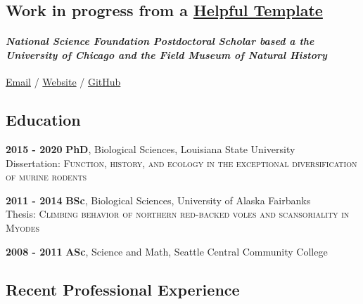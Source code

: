 \documentclass[
]{article}
\author{}
\date{\vspace{-2.5em}}
\begin{document}
\hypertarget{work-in-progress-from-a-helpful-template}{%
\subsection{\texorpdfstring{\textbf{Work in progress from a
\href{https://workwithcarolyn.com/blog/digital-cv-guide}{Helpful
Template}}}{Work in progress from a Helpful Template}}\label{work-in-progress-from-a-helpful-template}}

\hypertarget{national-science-foundation-postdoctoral-scholar-based-a-the-university-of-chicago-and-the-field-museum-of-natural-history}{%
\paragraph{\texorpdfstring{\emph{National Science Foundation
Postdoctoral Scholar based a the University of Chicago and the Field
Museum of Natural History}
}{National Science Foundation Postdoctoral Scholar based a the University of Chicago and the Field Museum of Natural History  }}\label{national-science-foundation-postdoctoral-scholar-based-a-the-university-of-chicago-and-the-field-museum-of-natural-history}}

\href{mailto:jonnatiions@gmail.com}{Email} /
\href{https://jonnynations.com/}{Website} /
\href{https://github.com/jonnations/}{GitHub}

\hypertarget{education}{%
\subsection{Education}\label{education}}

\textbf{2015 - 2020} \textbar{} \textbf{PhD}, Biological Sciences,
Louisiana State University\\
Dissertation: \textsc{Function, history, and ecology in the exceptional
diversification of murine rodents }

\textbf{2011 - 2014} \textbar{} \textbf{BSc}, Biological Sciences,
University of Alaska Fairbanks\\
Thesis: \textsc{Climbing behavior of northern red-backed voles and
scansoriality in Myodes }

\textbf{2008 - 2011} \textbar{} \textbf{ASc}, Science and Math, Seattle
Central Community College

\hypertarget{recent-professional-experience}{%
\subsection{Recent Professional
Experience}\label{recent-professional-experience}}
\end{document}
